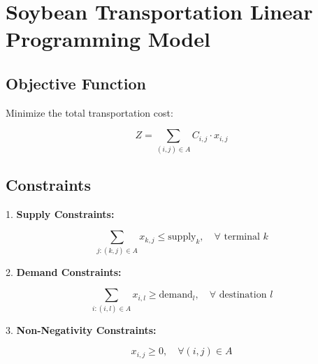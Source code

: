 \documentclass{article}
\begin{document}
\section*{Soybean Transportation Linear Programming Model}

\subsection*{Objective Function}

Minimize the total transportation cost:

\[
Z = \sum_{(i,j) \in A} C_{i,j} \cdot x_{i,j}
\]

\subsection*{Constraints}

1. \textbf{Supply Constraints:}

\[
\sum_{j: (k,j) \in A} x_{k,j} \leq \text{supply}_{k}, \quad \forall \text{ terminal } k
\]

2. \textbf{Demand Constraints:}

\[
\sum_{i: (i,l) \in A} x_{i,l} \geq \text{demand}_{l}, \quad \forall \text{ destination } l
\]

3. \textbf{Non-Negativity Constraints:}

\[
x_{i,j} \geq 0, \quad \forall (i,j) \in A
\]
\end{document}
